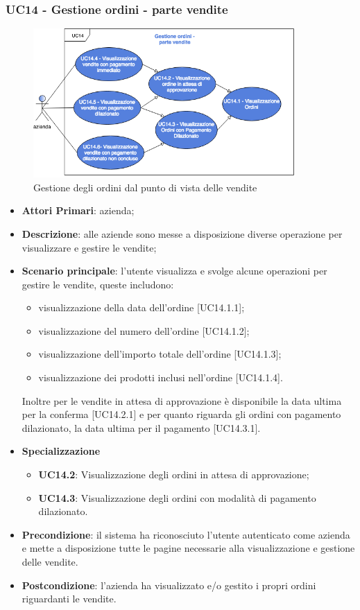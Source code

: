 \subsubsection{UC14 - Gestione ordini - parte vendite}
\begin{figure}[h]
	\includegraphics[width=10cm]{res/images/UC14ParteVendite.png}
	\centering
	\caption{Gestione degli ordini dal punto di vista delle vendite}
\end{figure}
\begin{itemize}
	\item \textbf{Attori Primari}: azienda;
	\item \textbf{Descrizione}: alle aziende sono messe a disposizione diverse operazione per visualizzare e gestire le vendite;
	\item \textbf{Scenario principale}: l'utente visualizza e svolge alcune operazioni per gestire le vendite, queste includono:
	\begin{itemize}
		\item visualizzazione della data dell'ordine [UC14.1.1];
		\item visualizzazione del numero dell'ordine [UC14.1.2];
		\item visualizzazione dell'importo totale dell'ordine [UC14.1.3];
		\item visualizzazione dei prodotti inclusi nell'ordine [UC14.1.4].
	\end{itemize}
Inoltre per le vendite in attesa di approvazione è disponibile la data ultima per la conferma [UC14.2.1] e per quanto riguarda gli ordini con pagamento dilazionato,  la data ultima per il pagamento [UC14.3.1].
	\item \textbf{Specializzazione}
	\begin{itemize}
		\item \textbf{UC14.2}: Visualizzazione degli ordini in attesa di approvazione;
		\item \textbf{UC14.3}: Visualizzazione degli ordini con modalità di pagamento dilazionato.
	\end{itemize}
	\item \textbf{Precondizione}: il sistema ha riconosciuto l'utente autenticato come azienda e mette a disposizione tutte le pagine necessarie alla visualizzazione e gestione delle vendite.
	\item \textbf{Postcondizione}: l'azienda ha visualizzato e/o gestito i propri ordini riguardanti le vendite.
\end{itemize} 

